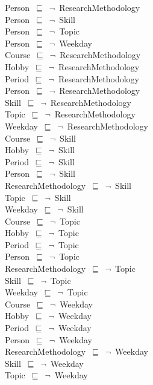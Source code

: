 \documentclass{article}
\begin{document}
Person~\ensuremath{\sqsubseteq}~\ensuremath{\lnot}~ResearchMethodology\\
Person~\ensuremath{\sqsubseteq}~\ensuremath{\lnot}~Skill\\
Person~\ensuremath{\sqsubseteq}~\ensuremath{\lnot}~Topic\\
Person~\ensuremath{\sqsubseteq}~\ensuremath{\lnot}~Weekday\\
Course~\ensuremath{\sqsubseteq}~\ensuremath{\lnot}~ResearchMethodology\\
Hobby~\ensuremath{\sqsubseteq}~\ensuremath{\lnot}~ResearchMethodology\\
Period~\ensuremath{\sqsubseteq}~\ensuremath{\lnot}~ResearchMethodology\\
Person~\ensuremath{\sqsubseteq}~\ensuremath{\lnot}~ResearchMethodology\\
Skill~\ensuremath{\sqsubseteq}~\ensuremath{\lnot}~ResearchMethodology\\
Topic~\ensuremath{\sqsubseteq}~\ensuremath{\lnot}~ResearchMethodology\\
Weekday~\ensuremath{\sqsubseteq}~\ensuremath{\lnot}~ResearchMethodology\\
Course~\ensuremath{\sqsubseteq}~\ensuremath{\lnot}~Skill\\
Hobby~\ensuremath{\sqsubseteq}~\ensuremath{\lnot}~Skill\\
Period~\ensuremath{\sqsubseteq}~\ensuremath{\lnot}~Skill\\
Person~\ensuremath{\sqsubseteq}~\ensuremath{\lnot}~Skill\\
ResearchMethodology~\ensuremath{\sqsubseteq}~\ensuremath{\lnot}~Skill\\
Topic~\ensuremath{\sqsubseteq}~\ensuremath{\lnot}~Skill\\
Weekday~\ensuremath{\sqsubseteq}~\ensuremath{\lnot}~Skill\\
Course~\ensuremath{\sqsubseteq}~\ensuremath{\lnot}~Topic\\
Hobby~\ensuremath{\sqsubseteq}~\ensuremath{\lnot}~Topic\\
Period~\ensuremath{\sqsubseteq}~\ensuremath{\lnot}~Topic\\
Person~\ensuremath{\sqsubseteq}~\ensuremath{\lnot}~Topic\\
ResearchMethodology~\ensuremath{\sqsubseteq}~\ensuremath{\lnot}~Topic\\
Skill~\ensuremath{\sqsubseteq}~\ensuremath{\lnot}~Topic\\
Weekday~\ensuremath{\sqsubseteq}~\ensuremath{\lnot}~Topic\\
Course~\ensuremath{\sqsubseteq}~\ensuremath{\lnot}~Weekday\\
Hobby~\ensuremath{\sqsubseteq}~\ensuremath{\lnot}~Weekday\\
Period~\ensuremath{\sqsubseteq}~\ensuremath{\lnot}~Weekday\\
Person~\ensuremath{\sqsubseteq}~\ensuremath{\lnot}~Weekday\\
ResearchMethodology~\ensuremath{\sqsubseteq}~\ensuremath{\lnot}~Weekday\\
Skill~\ensuremath{\sqsubseteq}~\ensuremath{\lnot}~Weekday\\
Topic~\ensuremath{\sqsubseteq}~\ensuremath{\lnot}~Weekday\\
\end{document}
